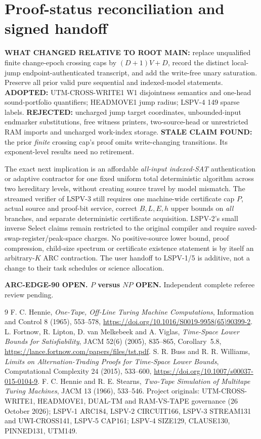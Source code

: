 \documentclass[11pt]{article}
\begin{document}
\section{Proof-status reconciliation and signed handoff}
\textbf{WHAT CHANGED RELATIVE TO ROOT MAIN:}
replace unqualified finite change-epoch crossing caps by
$(D+1)V+D$, record the distinct local-jump
endpoint-authenticated transcript, and add the
write-free unary saturation. Preserve all prior
valid pure sequential and indexed-model statements.
\textbf{ADOPTED:} UTM-CROSS-WRITE1 W1 disjointness
semantics and one-head sound-portfolio quantifiers;
HEADMOVE1 jump radius; LSPV-4 149 sparse labels.
\textbf{REJECTED:} uncharged jump target coordinates,
unbounded-input endmarker substitutions,
free witness printers, two-source-head or unrestricted
RAM imports and uncharged work-index storage.
\textbf{STALE CLAIM FOUND:} the prior \emph{finite}
crossing cap's proof omits write-changing transitions.
Its exponent-level results need no retirement.

The exact next implication is an affordable
\emph{all-input indexed-SAT} authentication or adaptive
contractor for one fixed uniform total deterministic
algorithm across two hereditary levels, without
creating source travel by model mismatch. The
streamed verifier of LSPV-3 still requires one
machine-wide certificate cap $P$, actual source
and proof-bit service, correct $B,L,E,h$ upper bounds
on \emph{all} branches, and separate deterministic
certificate acquisition. LSPV-2's small inverse Select
claims remain restricted to the original compiler
and require saved-swap-register/peak-space charges.
No positive-source lower bound, proof compression,
child-size spectrum or certificate existence statement
is by itself an arbitrary-$K$ ARC contraction.
The user handoff to LSPV-1/5 is additive, not
a change to their task schedules or science allocation.

\noindent\textbf{ARC-EDGE-90 OPEN. $P$ versus $NP$ OPEN.}
Independent complete referee review pending.
\begin{thebibliography}{9}
 F. C. Hennie, \emph{One-Tape, Off-Line
Turing Machine Computations}, Information and Control
8 (1965), 553--578,
\url{https://doi.org/10.1016/S0019-9958(65)90399-2}.
 L. Fortnow, R. Lipton, D. van Melkebeek
and A. Viglas, \emph{Time-Space Lower Bounds for
Satisfiability}, JACM 52(6) (2005), 835--865,
Corollary~5.8,
\url{https://lance.fortnow.com/papers/files/tst.pdf}.
 S. R. Buss and R. R. Williams,
\emph{Limits on Alternation-Trading Proofs for
Time-Space Lower Bounds}, Computational Complexity
24 (2015), 533--600,
\url{https://doi.org/10.1007/s00037-015-0104-9}.
 F. C. Hennie and R. E. Stearns,
\emph{Two-Tape Simulation of Multitape Turing Machines},
JACM 13 (1966), 533--546.
 Project originals: UTM-CROSS-WRITE1,
HEADMOVE1, DUAL-TM and RAM-VS-TAPE governance (26 October 2026);
LSPV-1 ARC184, LSPV-2 CIRCUIT166, LSPV-3 STREAM131
and UWI-CROSS141, LSPV-5 CAP161; LSPV-4
SIZE129, CLAUSE130, PINNED131, UTM149.
\end{thebibliography}
\end{document}
